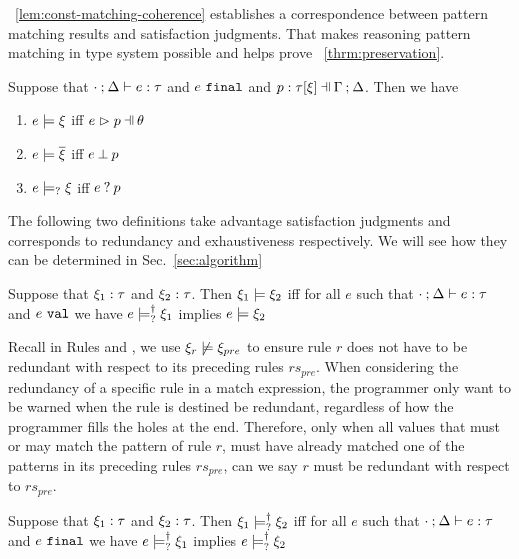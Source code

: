 \documentclass[runningheads,envcountsame,a4paper]{llncs}
\begin{document}
\lemmaname~\ref{lem:const-matching-coherence} establishes a correspondence
between pattern matching results and satisfaction judgments. That makes
reasoning pattern matching in type system possible and helps prove
\theoremname~\ref{thrm:preservation}.

\begin{lemma}
  \label{lem:const-matching-coherence}
  Suppose that $\cdot \mathbin{;} \Delta \vdash e : \tau$ and $e ~\mathtt{final}$ and $\chpattyp{p}{\tau}{\xi}{\Gamma}{\Delta}$. Then we have
  \begin{enumerate}
  \item $e \models \xi$ iff $\hpatmatch{e}{p}{\theta}$
  \item $e \models \overline{\xi}$ iff $e \mathbin{\bot} p$
  \item $e \models_{?} \xi$ iff $e \mathbin{?} p$
  \end{enumerate}
\end{lemma}

The following two definitions take advantage satisfaction judgments and
corresponds to redundancy and exhaustiveness respectively. We will see how they
can be determined in Sec.~\ref{sec:algorithm}

\begin{definition}
  \label{defn:const-entailment}
  Suppose that $\xi_1 : \tau$ and $\xi_2 : \tau$.
  Then $\xi_1 \models \xi_2$ iff for all $e$ such that $\cdot \mathbin{;} \Delta \vdash e : \tau$ and $e ~\mathtt{val}$ we have $e \models_{?}^{\dag} \xi_1$ implies $e \models \xi_2$
\end{definition}

Recall in Rules \TOneRules and \TRules, we use $\xi_r \not\models \xi_{pre}$ to ensure rule $r$ does not have to be redundant with respect to its preceding rules $rs_{pre}$. When considering the redundancy of a specific rule in a match expression, the programmer only want to be warned when the rule is destined be redundant, regardless of how the programmer fills the holes at the end. Therefore, only when all values that must or may match the pattern of rule $r$, must have already matched one of the patterns in its preceding rules $rs_{pre}$, can we say $r$ must be redundant with respect to $rs_{pre}$.

\begin{definition}
  \label{defn:nn-entailment}
  Suppose that $\xi_1 : \tau$ and $\xi_2 : \tau$. Then $\xi_1 \models_{?}^{\dag} \xi_2$ iff for all $e$ such that $\cdot \mathbin{;} \Delta \vdash e : \tau$ and $e ~\mathtt{final}$ we have $e \models_{?}^{\dag} \xi_1$ implies $e \models_{?}^{\dag} \xi_2$ 
\end{definition}
\end{document}
